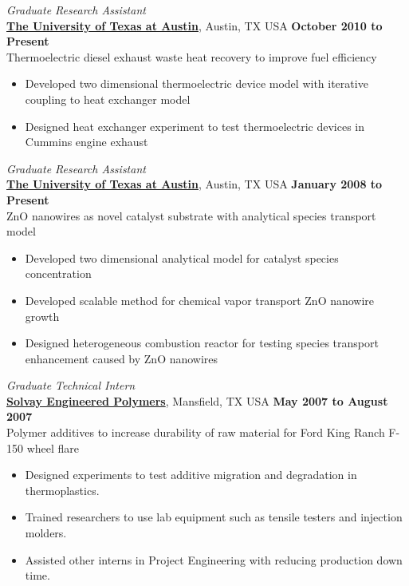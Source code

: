 \documentclass[centered]{res}
\begin{document}
\begin{resume}
\textit{Graduate Research Assistant} \\
\href{http://www.utexas.edu/}{\textbf{The University of Texas at
    Austin}}, Austin, TX USA%
\hfill \textbf{October 2010 to Present} \\
Thermoelectric diesel exhaust waste heat recovery to improve fuel
efficiency
\begin{itemize} \itemsep -2pt
\item Developed two dimensional thermoelectric device model with
  iterative coupling to heat exchanger model
\item Designed heat exchanger experiment to test thermoelectric
  devices in Cummins engine exhaust
\end{itemize} 
%
\textit{Graduate Research Assistant} \\
\href{http://www.utexas.edu/}{\textbf{The University of Texas at
    Austin}}, Austin, TX USA%
\hfill \textbf{January 2008 to Present} \\
ZnO nanowires as novel catalyst substrate with analytical species
transport model
\begin{itemize} \itemsep -2pt %
\item Developed two dimensional analytical model for catalyst
  species concentration
\item Developed scalable method for chemical vapor transport ZnO
  nanowire growth
\item Designed heterogeneous combustion reactor for testing species
  transport enhancement caused by ZnO nanowires
\end{itemize} 
\newpage
\textit{Graduate Technical Intern} \\
\href{http://www.lyondellbasell.com/LandingPages/SolvayEngineeredPolymers}{\textbf{Solvay
    Engineered Polymers}}, Mansfield, TX USA 
\hfill \textbf{May 2007 to August 2007} \\
Polymer additives to increase durability of raw material for Ford King
Ranch F-150 wheel flare
\begin{itemize} \itemsep -2pt %
\item Designed experiments to test additive migration
  and degradation in thermoplastics.
\item Trained researchers to use lab equipment such as tensile
  testers and injection molders.
\item Assisted other interns in Project Engineering with
  reducing production down time.
\end{itemize} 

\end{resume}
\end{document}
